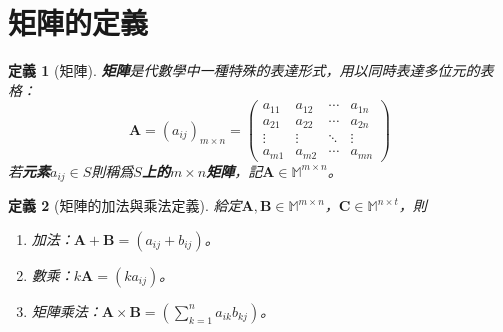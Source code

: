\documentclass[12pt]{article}
\newtheorem{definition}{定義}
\begin{document}
    \section*{矩陣的定義}

    \begin{definition}[矩陣]
        \textbf{矩陣}是代數學中一種特殊的表達形式，用以同時表達多位元的表格：$$\mathbf{A}=(a_{ij})_{m\times n}=\begin{pmatrix}
            a_{11}&a_{12}&\cdots&a_{1n}\\
            a_{21}&a_{22}&\cdots&a_{2n}\\
            \vdots&\vdots&\ddots&\vdots\\
            a_{m1}&a_{m2}&\cdots&a_{mn}
        \end{pmatrix}$$
        若\textbf{元素}$a_{ij}\in S$則稱爲\textbf{$S$上的$m\times n$矩陣}，記$\mathbf{A}\in \mathbb{M}^{m\times n}$。
    \end{definition}

    \begin{definition}[矩陣的加法與乘法定義]
        給定$\mathbf{A},\mathbf{B}\in\mathbb{M}^{m\times n}$，$\mathbf{C}\in\mathbb{M}^{n\times t}$，則\begin{enumerate}
            \item 加法：$\mathbf{A}+\mathbf{B}=(a_{ij}+b_{ij})$。
            \item 數乘：$k\mathbf{A}=(ka_{ij})$。
            \item 矩陣乘法：$\mathbf{A}\times\mathbf{B}=(\sum_{k=1}^{n}a_{ik}b_{kj})$。
        \end{enumerate}
    \end{definition}
\end{document}
